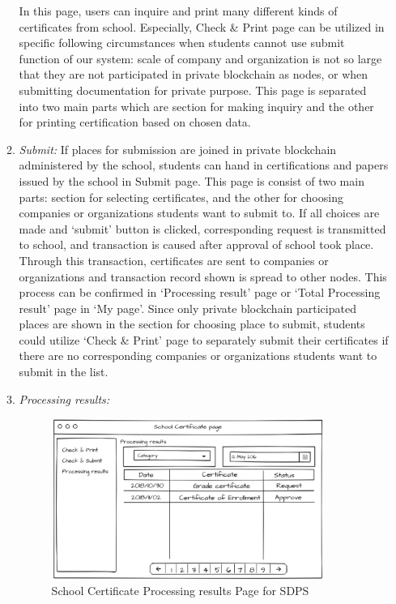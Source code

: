 \documentclass[conference]{IEEEtran}
\begin{document}
\begin{enumerate}
\begin{enumerate}
	In this page, users can inquire and print many different kinds of certificates from school. Especially, Check \& Print page can be utilized in specific following circumstances when students cannot use submit function of our system: scale of company and organization is not so large that they are not participated in private blockchain as nodes, or when submitting documentation for private purpose. This page is separated into two main parts which are section for making inquiry and the other for printing certification based on chosen data. \\
        \item \textit{Submit: }If places for submission are joined in private blockchain administered by the school, students can hand in certifications and papers issued by the school in Submit page. This page is consist of two main parts: section for selecting certificates, and the other for choosing companies or organizations students want to submit to. If all choices are made and ‘submit’ button is clicked, corresponding request is transmitted to school, and transaction is caused after approval of school took place. Through this transaction, certificates are sent to companies or organizations and transaction record shown is spread to other nodes. This process can be confirmed in ‘Processing result’ page or ‘Total Processing result’ page in ‘My page’. Since only private blockchain participated places are shown in the section for choosing place to submit, students could utilize ‘Check \& Print’ page to separately submit their certificates if there are no corresponding companies or organizations students want to submit in the list. \\
         \item \textit{Processing results:} 
         \begin{figure}[htbp]
	\centerline{\includegraphics[width=89mm,scale=0.5]{student/certificate_processing.png}}
	\caption{School Certificate Processing results Page for SDPS}
	\label{fig}
	\end{figure}
         

\end{enumerate}
\end{enumerate}
\end{document}

